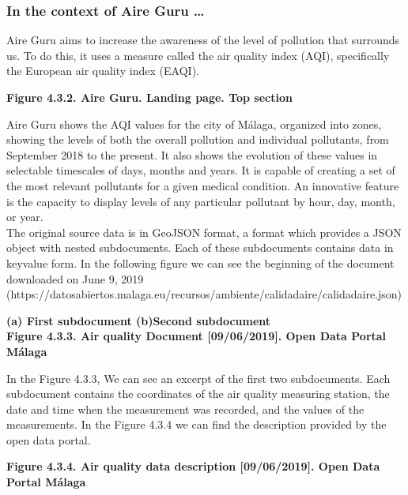 \subsubsection*{In the context of Aire Guru \ldots} 

Aire Guru aims to increase the awareness of the level of pollution that surrounds us.
To do this, it uses a measure called the air quality index (AQI), specifically the European air quality index (EAQI).

\begin{center}
    \bf{        
    Figure 4.3.2. Aire Guru. Landing page. Top section}
\end{center}

Aire Guru shows the AQI values for the city of Málaga, organized into zones, showing the levels of both the overall pollution and individual pollutants, from September 2018 to the present.
It also shows the evolution of these values in selectable timescales of days, months and years.
It is capable of creating a set of the most relevant pollutants for a given medical condition.
An innovative feature is the capacity to display levels of any particular pollutant by hour, day, month, or year. \\

The original source data is in GeoJSON format, a format which provides a JSON object with nested subdocuments.
Each of these subdocuments contains data in key\-value form.
In the following figure we can see the beginning of the document downloaded on June 9, 2019 (https://datosabiertos.malaga.eu/recursos/ambiente/calidadaire/calidadaire.json) \\

\begin{center}
    \bf{        (a) First subdocument (b)Second subdocument \\
    Figure 4.3.3. Air quality Document [09/06/2019]. Open Data Portal Málaga}
\end{center}

In the Figure 4.3.3, We can see an excerpt of the first two subdocuments.
Each subdocument contains the coordinates of the air quality measuring station, the date and time when the measurement was recorded, and the values of the measurements.
In the Figure 4.3.4 we can find the description provided by the open data portal.\\
    
\begin{center}
    \bf{        
    Figure 4.3.4. Air quality data description [09/06/2019]. Open Data Portal Málaga}
\end{center}

